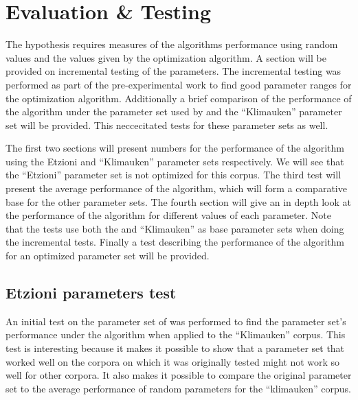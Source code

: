 

\chapter{Evaluation \& Testing} %

\label{EvaluationTesting} %


The hypothesis requires measures of the algorithms performance using random values and the values given by the optimization algorithm. A section will be provided on incremental testing of the parameters. The incremental testing was performed as part of the pre-experimental work to find good parameter ranges for the optimization algorithm. Additionally a brief comparison of the performance of the algorithm under the parameter set used by \cite{Oren1998} and the ``Klimauken'' parameter set will be provided. This neccecitated tests for these parameter sets as well.

The first two sections will present numbers for the performance of the algorithm using the Etzioni and ``Klimauken'' parameter sets respectively. We will see that the ``Etzioni'' parameter set is not optimized for this corpus. The third test will present the average performance of the algorithm, which will form a comparative base for the other parameter sets. The fourth section will give an in depth look at the performance of the algorithm for different values of each parameter. Note that the tests use both the \cite{Oren1998} and ``Klimauken'' as base parameter sets when doing the incremental tests. Finally a test describing the performance of the algorithm for an optimized parameter set will be provided.


\section{Etzioni parameters test}
An initial test on the parameter set of \citeauthor{Oren1998} was performed to find the parameter set's performance under the \CTC algorithm when applied to the ``Klimauken'' corpus. This test is interesting because it makes it possible to show that a parameter set that worked well on the corpora on which it was originally tested might not work so well for other corpora. It also makes it possible to compare the original parameter set to the average performance of random parameters for the ``klimauken'' corpus.

